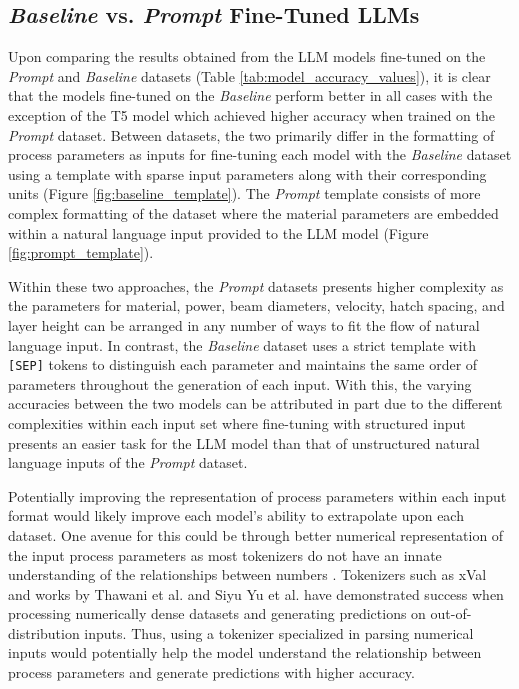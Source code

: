 \subsection{\textit{Baseline} vs. \textit{Prompt} Fine-Tuned LLMs}
Upon comparing the results obtained from the LLM models fine-tuned on the
\textit{Prompt} and \textit{Baseline} datasets (Table
\ref{tab:model_accuracy_values}), it is clear that the models fine-tuned on the
\textit{Baseline} perform better in all cases with the exception of the T5 model
which achieved higher accuracy when trained on the \textit{Prompt} dataset.
Between datasets, the two primarily differ in the formatting of process
parameters as inputs for fine-tuning each model with the \textit{Baseline}
dataset using a template with sparse input parameters along with their
corresponding units (Figure \ref{fig:baseline_template}). The \textit{Prompt}
template consists of more complex formatting of the dataset where the material
parameters are embedded within a natural language input provided to the LLM
model (Figure \ref{fig:prompt_template}).

Within these two approaches, the \textit{Prompt} datasets presents higher
complexity as the parameters for material, power, beam diameters, velocity,
hatch spacing, and layer height can be arranged in any number of ways to fit the
flow of natural language input. In contrast, the \textit{Baseline} dataset uses
a strict template with \texttt{[SEP]} tokens to distinguish each parameter and
maintains the same order of parameters throughout the generation of each input.
With this, the varying accuracies between the two models can be attributed in
part due to the different complexities within each input set where fine-tuning
with structured input presents an easier task for the LLM model than that of
unstructured natural language inputs of the \textit{Prompt} dataset.

Potentially improving the representation of process parameters within each input
format would likely improve each model's ability to extrapolate upon each
dataset. One avenue for this could be through better numerical representation of
the input process parameters as most tokenizers do not have an innate
understanding of the relationships between numbers
\cite{thawani_representing_2021}. Tokenizers such as xVal
\cite{golkar_xval_2024} and works by Thawani et al.
\cite{thawani_representing_2021} and Siyu Yu et al. \cite{yu_unlocking_2024}
have demonstrated success when processing numerically dense datasets and
generating predictions on out-of-distribution inputs. Thus, using a tokenizer
specialized in parsing numerical inputs would potentially help the model
understand the relationship between process parameters and generate predictions
with higher accuracy.

